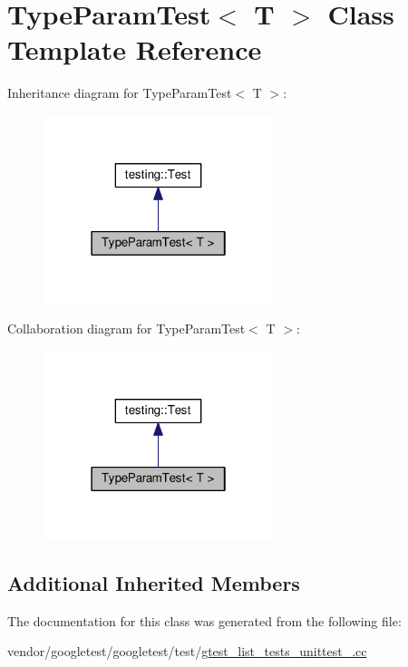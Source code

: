 \hypertarget{classTypeParamTest}{}\section{Type\+Param\+Test$<$ T $>$ Class Template Reference}
\label{classTypeParamTest}


Inheritance diagram for Type\+Param\+Test$<$ T $>$\+:\nopagebreak
\begin{figure}[H]
\begin{center}
\leavevmode
\includegraphics[width=190pt]{classTypeParamTest__inherit__graph}
\end{center}
\end{figure}


Collaboration diagram for Type\+Param\+Test$<$ T $>$\+:\nopagebreak
\begin{figure}[H]
\begin{center}
\leavevmode
\includegraphics[width=190pt]{classTypeParamTest__coll__graph}
\end{center}
\end{figure}
\subsection*{Additional Inherited Members}


The documentation for this class was generated from the following file\+:\begin{DoxyCompactItemize}
\item 
vendor/googletest/googletest/test/\hyperlink{gtest__list__tests__unittest___8cc}{gtest\+\_\+list\+\_\+tests\+\_\+unittest\+\_\+.\+cc}\end{DoxyCompactItemize}
